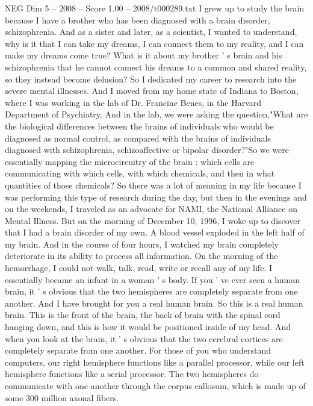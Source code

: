 \begin{textsample}{NEG Dim 5 – 2008 – Score 1.00 – 2008/t000289.txt}  \label{ex:f5_neg_068}
I grew up to study the brain because I have a brother who has been diagnosed with a brain disorder, schizophrenia.
And as a sister and later, as a scientist, I wanted to understand, why is it that I can take my dreams, I can connect them to my reality, and I can make my dreams come true?
What is it about my brother ' s brain and his schizophrenia that he cannot connect his dreams to a common and shared reality, so they instead become delusion?
So I dedicated my career to research into the severe mental illnesses.
And I moved from my home state of Indiana to Boston, where I was working in the lab of Dr.
Francine Benes, in the Harvard Department of Psychiatry.
And in the lab, we were asking the question,"What are the biological differences between the brains of individuals who would be diagnosed as normal control, as compared with the brains of individuals diagnosed with schizophrenia, schizoaffective or bipolar disorder?"So we were essentially mapping the microcircuitry of the brain : which cells are communicating with which cells, with which chemicals, and then in what quantities of those chemicals?
So there was a lot of meaning in my life because I was performing this type of research during the day, but then in the evenings and on the weekends, I traveled as an advocate for NAMI, the National Alliance on Mental Illness.
But on the morning of December 10, 1996, I woke up to discover that I had a brain disorder of my own.
A blood vessel exploded in the left half of my brain.
And in the course of four hours, I watched my brain completely deteriorate in its ability to process all information.
On the morning of the hemorrhage, I could not walk, talk, read, write or recall any of my life.
I essentially became an infant in a woman ' s body.
If you ' ve ever seen a human brain, it ' s obvious that the two hemispheres are completely separate from one another.
And I have brought for you a real human brain.
So this is a real human brain.
This is the front of the brain, the back of brain with the spinal cord hanging down, and this is how it would be positioned inside of my head.
And when you look at the brain, it ' s obvious that the two cerebral cortices are completely separate from one another.
For those of you who understand computers, our right hemisphere functions like a parallel processor, while our left hemisphere functions like a serial processor.
The two hemispheres do communicate with one another through the corpus callosum, which is made up of some 300 million axonal fibers.

\end{textsample}
